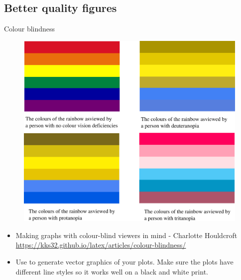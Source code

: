 \documentclass[10pt,times]{beamer}
\begin{document}
\subsection{Better quality figures}
\begin{frame}{Colour blindness}
\begin{figure}
\includegraphics[height=0.6\textheight]{figs/colourblindness_rainbow.png}
\end{figure}
\begin{itemize}
\item Making graphs with colour-blind viewers in mind - Charlotte Houldcroft
\href{https://kks32.github.io/latex/articles/colour-blindness/}
{https://kks32.github.io/latex/articles/colour-blindness/}

\item Use  to generate vector graphics of your plots. Make sure 
the plots have different line styles so it works well on a black and white 
print.
\end{itemize}
\end{frame}

\end{document}
